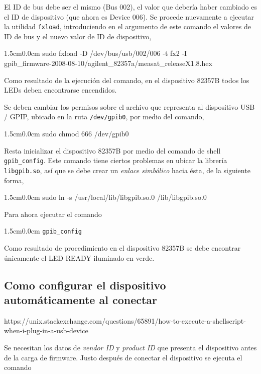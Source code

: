 \documentclass[paper=letter,oneside,fontsize=11pt, parskip=full]{scrartcl}
\newenvironment{code}
	{\begin{adjustwidth}{1.5cm}{0.0cm}\ttfamily}
	{\end{adjustwidth}}
\begin{document}
		El ID de bus debe ser el mismo (Bus 002), el valor que debería haber cambiado es el ID de dispositivo (que ahora es Device 006). Se procede nuevamente a ejecutar la utilidad \texttt{fxload}, introduciendo en el argumento de este comando el valores de ID de bus y el nuevo valor de ID de dispositivo,
		
		\begin{code}
			sudo fxload -D /dev/bus/usb/002/006  -t fx2 -I \\ gpib\_firmware-2008-08-10/agilent\_82357a/measat\_releaseX1.8.hex
		\end{code}
		
		Como resultado de la ejecución del comando, en el dispositivo 82357B todos los LEDs deben encontrarse encendidos.		
		
		Se deben cambiar los permisos sobre el archivo que representa al dispositivo USB / GPIP, ubicado en la ruta \texttt{/dev/gpib0}, por medio del comando,
		
		\begin{code}
			sudo chmod 666 /dev/gpib0
		\end{code}
		
		Resta inicializar el dispositivo 82357B por medio del comando de shell \texttt{gpib\_config}. Este comando tiene ciertos problemas en ubicar la librería \texttt{libgpib.so}, así que se debe crear un \emph{enlace simbólico} hacia ésta, de la siguiente forma,
		
		\begin{code}
			sudo ln -s /usr/local/lib/libgpib.so.0 /lib/libgpib.so.0
		\end{code}
		
		Para ahora ejecutar el comando
			
		\begin{code}
			\texttt{gpib\_config}
		\end{code}
	
		Como resultado de procedimiento en el dispositivo 82357B se debe encontrar únicamente el LED READY iluminado en verde.
		
	\subsection{Como configurar el dispositivo automáticamente al conectar}
	
	https://unix.stackexchange.com/questions/65891/how-to-execute-a-shellscript-when-i-plug-in-a-usb-device
	
	Se necesitan los datos de \emph{vendor ID} y \emph{product ID} que presenta el dispositivo antes de la carga de firmware. Justo después de conectar el dispositivo se ejecuta el comando
	
\end{document}
